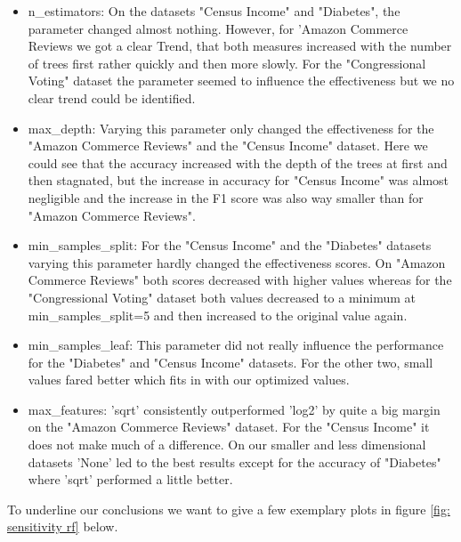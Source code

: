 \documentclass[a4paper,10pt]{article}
\begin{document}
\begin{itemize}
    \item \textsf{n\_estimators}: On the datasets "Census Income" and "Diabetes", the parameter changed almost nothing. However, for 'Amazon Commerce Reviews we got a clear Trend, that both measures increased with the number of trees first rather quickly and then more slowly. For the "Congressional Voting" dataset the parameter seemed to influence the effectiveness but we no clear trend could be identified. 
\item \textsf{max\_depth}: Varying this parameter only changed the effectiveness for the "Amazon Commerce Reviews"  and the "Census Income" dataset. Here we could see that the accuracy increased with the depth of the trees at first and then stagnated, but the increase in accuracy for "Census Income" was almost negligible and the increase in the F1 score was also way smaller than for "Amazon Commerce Reviews".

\item \textsf{min\_samples\_split}: For the "Census Income" and the "Diabetes" datasets varying this parameter hardly changed the effectiveness scores. On "Amazon Commerce Reviews" both scores decreased with higher values whereas for the "Congressional Voting" dataset both values decreased to a minimum at \\ \textsf{min\_samples\_split}=5 and then increased to the original value again.
\item \textsf{min\_samples\_leaf}: This parameter did not really influence the performance for the "Diabetes" and "Census Income" datasets. For the other two, small values fared better which fits in with our optimized values.
\item \textsf{max\_features}: 'sqrt' consistently outperformed 'log2' by quite a big margin on the "Amazon Commerce Reviews" dataset. For the "Census Income" it does not make much of a difference. On our smaller and less dimensional datasets 'None' led to the best results except for the accuracy of "Diabetes" where 'sqrt' performed a little better.
\end{itemize}

To underline our conclusions we want to give a few exemplary plots in figure \ref{fig: sensitivity rf} below. 
\end{document}
